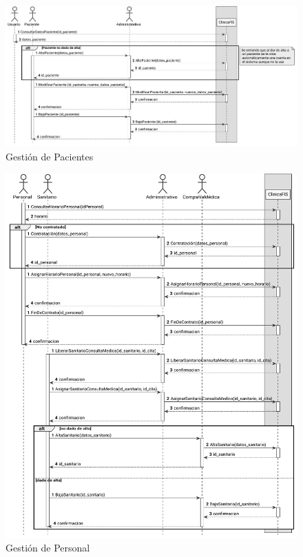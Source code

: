 \documentclass[11pt,a4paper]{article}
\begin{document}
\begin{figure}[H]
	\caption{Gestión de Pacientes}
	\centering
	\includegraphics[width=\textwidth,height=\textheight,keepaspectratio]{diagramas/pdf/diagramaPaciente.pdf}
\end{figure}

\begin{figure}[H]
	\caption{Gestión de Personal}
	\centering
	\includegraphics[width=\textwidth,height=\textheight,keepaspectratio]{diagramas/pdf/diagramaPersonal.pdf}
\end{figure}
\end{document}
